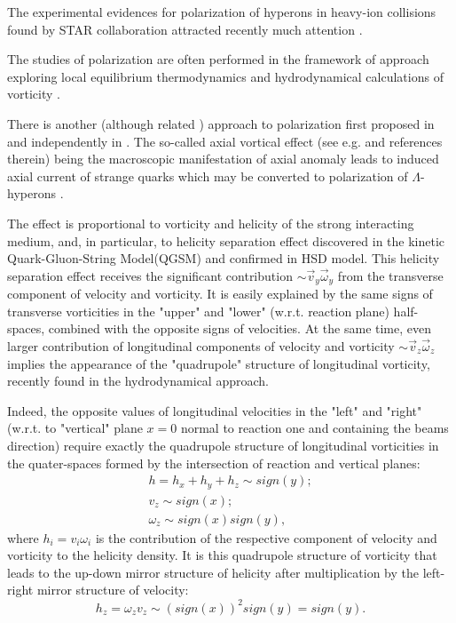 \documentclass[preprint,aps,showpacs,nofootinbib,superscriptaddress,preprintnumbers,epsf,psf]{revtex4}
\begin{document}
The experimental evidences for polarization of hyperons in heavy-ion
collisions found by STAR collaboration \cite{Lisa} attracted
recently much attention
\cite{Becattini:2016gvu,Karpenko:2016jyx,Karpenko:2016idy,Xie:2015xpa,Fang:2016uds}.

The studies of polarization are often performed
\cite{Becattini:2013vja} in the framework of approach exploring
local equilibrium thermodynamics \cite{Becattini:2014yxa} and
hydrodynamical calculations of vorticity
\cite{Betz:2007kg,Csernai:2013bqa,Csernai:2014hva}.

There is another (although related \cite{Prokhorov:2017atp}) approach to polarization first proposed in
\cite{Rogachevsky:2010ys} and independently in \cite{Gao:2012ix}.
The so-called axial vortical effect (see e.g.
\cite{Kalaydzhyan:2014bfa} and references therein) being the
macroscopic manifestation of axial anomaly \cite{Son:2009tf} leads to
induced axial current of strange quarks which may be converted to
polarization of $\Lambda$-hyperons
\cite{Rogachevsky:2010ys,Gao:2012ix}.

The effect is proportional to vorticity and helicity of the strong
interacting medium, and, in particular, to helicity separation effect  discovered  \cite{Baznat:2013zx} in the
kinetic Quark-Gluon-String
Model(QGSM)\cite{toneev83,toneev90,amelin91} and confirmed \cite{Teryaev:2015gxa}  in HSD \cite{Cassing:1999es} model. 
This helicity separation effect receives  \cite{Baznat:2013zx,Teryaev:2015gxa} 
the significant contribution $ \sim \vec v_y \vec \omega_y$ from the transverse component of velocity and vorticity. It is easily explained \cite{Baznat:2013zx} by the same signs of transverse vorticities in the 
"upper" and "lower" (w.r.t. reaction plane) half-spaces, combined with the opposite signs of velocities. 
 At the same time, even larger contribution  \cite{Baznat:2013zx,Teryaev:2015gxa} of longitudinal components of velocity and vorticity $\sim \vec v_z \vec \omega_z$ implies the appearance of the
"quadrupole" structure of longitudinal vorticity, recently found \cite{Becattini:2017gcx} in the hydrodynamical approach.  


Indeed, the opposite values of longitudinal velocities in the "left" and "right" (w.r.t. to "vertical" plane $x=0$ normal to reaction one and containing the beams direction) require exactly the quadrupole structure of longitudinal vorticities in the quater-spaces formed by the intersection of reaction and vertical planes: 
\begin{eqnarray}
h =h_x+h_y+h_z \sim sign(y); \\
v_z \sim sign (x); \\ 
\omega_z \sim sign(x) sign (y),  
\end{eqnarray}
where $h_i =  v_i \omega_i$ is the contribution of the respective component of velocity and vorticity to the helicity density.   
It is this quadrupole structure of vorticity that leads to the up-down mirror structure of helicity  after multiplication by the left-right mirror structure of velocity: 
$$h_z = \omega_z v_z \sim (sign(x))^2 sign(y) = sign(y).$$ 
\end{document}
